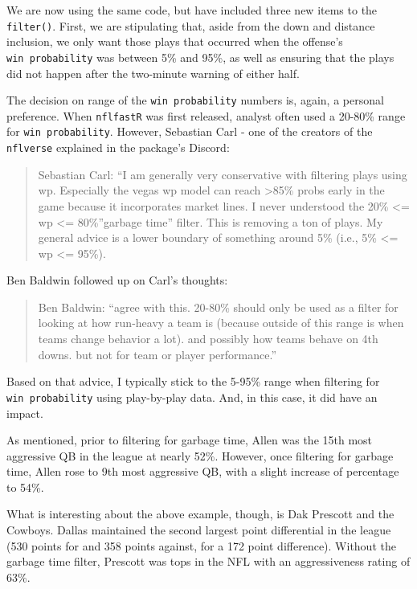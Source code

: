 \documentclass[
  letterpaper,
]{krantz}
\begin{document}
We are now using the same code, but have included three new items to the
\texttt{filter()}. First, we are stipulating that, aside from the down
and distance inclusion, we only want those plays that occurred when the
offense's \texttt{win\ probability} was between 5\% and 95\%, as well as
ensuring that the plays did not happen after the two-minute warning of
either half.

The decision on range of the \texttt{win\ probability} numbers is,
again, a personal preference. When \texttt{nflfastR} was first released,
analyst often used a 20-80\% range for \texttt{win\ probability}.
However, Sebastian Carl - one of the creators of the \texttt{nflverse}
explained in the package's Discord:

\begin{quote}
Sebastian Carl: ``I am generally very conservative with filtering plays
using wp. Especially the vegas wp model can reach \textgreater85\% probs
early in the game because it incorporates market lines. I never
understood the 20\% \textless= wp \textless= 80\%''garbage time''
filter. This is removing a ton of plays. My general advice is a lower
boundary of something around 5\% (i.e., 5\% \textless= wp \textless=
95\%).
\end{quote}

Ben Baldwin followed up on Carl's thoughts:

\begin{quote}
Ben Baldwin: ``agree with this. 20-80\% should only be used as a filter
for looking at how run-heavy a team is (because outside of this range is
when teams change behavior a lot). and possibly how teams behave on 4th
downs. but not for team or player performance.''
\end{quote}

Based on that advice, I typically stick to the 5-95\% range when
filtering for \texttt{win\ probability} using play-by-play data. And, in
this case, it did have an impact.

As mentioned, prior to filtering for garbage time, Allen was the 15th
most aggressive QB in the league at nearly 52\%. However, once filtering
for garbage time, Allen rose to 9th most aggressive QB, with a slight
increase of percentage to 54\%.

What is interesting about the above example, though, is Dak Prescott and
the Cowboys. Dallas maintained the second largest point differential in
the league (530 points for and 358 points against, for a 172 point
difference). Without the garbage time filter, Prescott was tops in the
NFL with an aggressiveness rating of 63\%.
\end{document}
